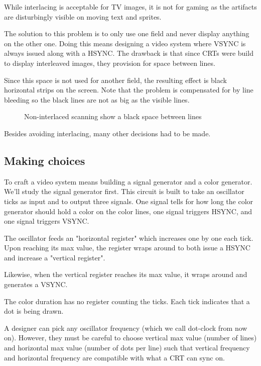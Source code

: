 While interlacing is acceptable for TV images, it is not for gaming as the artifacts are disturbingly visible on moving text and sprites. 

The solution to this problem is to only use one field and never display anything on the other one. Doing this means designing a video system where VSYNC is always issued along with a HSYNC. The drawback is that since CRTs were build to display interleaved images, they provision for space between lines. 

Since this space is not used for another field, the resulting effect is black horizontal strips on the screen. Note that the problem is compensated for by line bleeding so the black lines are not as big as the visible lines.

\begin{figure}[H]
\caption*{Non-interlaced scanning show a black space between lines}
\end{figure}


Besides avoiding interlacing, many other decisions had to be made.





\subsection{Making choices}

To craft a video system means building a signal generator and a color generator. We'll study the signal generator first. This circuit is built to take an oscillator ticks as input and to output three signals. One signal tells for how long the color generator should hold a color on the color lines, one signal triggers HSYNC, and one signal triggers VSYNC. 


The oscillator feeds an "horizontal register" which increases one by one each tick. Upon reaching its max value, the register wraps around to both issue a HSYNC and increase a "vertical register". 

Likewise, when the vertical register reaches its max value, it wraps around and generates a VSYNC. 

The color duration has no register counting the ticks. Each tick indicates that a dot is being drawn.

A designer can pick any oscillator frequency (which we call dot-clock from now on). However, they must be careful to choose vertical max value (number of lines) and horizontal max value (number of dots per line) such that vertical frequency and horizontal frequency are compatible with what a CRT can sync on. 

